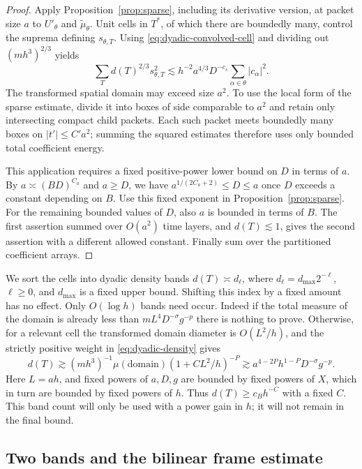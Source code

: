 \begin{proof}
Apply Proposition~\ref{prop:sparse}, including its derivative version,
at packet size $a$ to $U'_\theta$ and
$\widetilde\mu_\theta$.  Unit cells in $T^*$, of which there are
boundedly many, control the suprema defining $s_{\theta,T}$.
Using \eqref{eq:dyadic-convolved-cell} and dividing out
$(mh^3)^{2/3}$ yields
\[
 \sum_T d(T)^{2/3}s_{\theta,T}^2
 \lesssim h^{-2}a^{4/3}D^{-c_s}
       \sum_{\alpha\in\theta}|c_\alpha|^2.
\]
The transformed spatial domain may exceed size $a^2$.  To use the local
form of the sparse estimate, divide it into boxes of side comparable to
$a^2$ and retain only intersecting compact child packets.  Each such
packet meets boundedly many boxes on $|t'|\leq C'a^2$; summing the
squared estimates therefore uses only bounded total coefficient energy.

This application requires a fixed positive-power lower bound on $D$ in
terms of $a$.  By $a\asymp(BD)^{C_a}$ and $a\geq D$, we have
$a^{1/(2C_a+2)}\leq D\leq a$ once $D$ exceeds a constant depending on
$B$.  Use this fixed exponent in Proposition~\ref{prop:sparse}.
For the remaining bounded values of $D$, also $a$ is bounded in terms
of $B$.  The first assertion summed over $O(a^2)$ time layers, and
$d(T)\lesssim1$, gives the second assertion with a different allowed
constant.  Finally sum over the partitioned coefficient arrays.
\end{proof}

We sort the cells into dyadic density bands
$d(T)\asymp d_\ell$, where $d_\ell=d_{\max}2^{-\ell}$,
$\ell\geq0$, and $d_{\max}$ is a fixed upper bound.  Shifting this
index by a fixed amount has no effect.  Only $O(\log h)$ bands need
occur.  Indeed if the total measure of the domain is already less than
$mL^4D^{-\sigma}g^{-p}$ there is nothing to prove.  Otherwise, for a
relevant cell the transformed domain diameter is $O(L^2/h)$, and the
strictly positive weight in \eqref{eq:dyadic-density} gives
\begin{equation}\label{eq:dyadic-density-lower}
 d(T)\gtrsim (mh^3)^{-1}\mu(\text{domain})
                   (1+CL^2/h)^{-P}
 \gtrsim a^{4-2P}h^{1-P}D^{-\sigma}g^{-p}.
\end{equation}
Here $L=ah$, and fixed powers of $a,D,g$ are bounded by fixed powers of
$X$, which in turn are bounded by fixed powers of $h$.  Thus
$d(T)\geq c_B h^{-C}$ with a fixed $C$.  This band count will only be
used with a power gain in $h$; it will not remain in the final bound.

\subsection{Two bands and the bilinear frame estimate}


